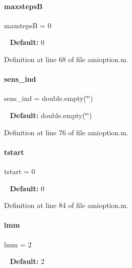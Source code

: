 \paragraph{\texorpdfstring{maxstepsB}{maxstepsB}}
{\footnotesize\ttfamily maxstepsB = 0}

~\newline
{\bfseries Default\+:} 0 

Definition at line 68 of file amioption.\+m.

\mbox{\label{classamioption_a0505783cf66f362672cbe3320d47a94d}} 
\paragraph{\texorpdfstring{sens\+\_\+ind}{sens\_ind}}
{\footnotesize\ttfamily sens\+\_\+ind = double.\+empty(\char`\"{}\char`\"{})}

~\newline
{\bfseries Default\+:} double.\+empty(\char`\"{}\char`\"{}) 

Definition at line 76 of file amioption.\+m.

\mbox{\label{classamioption_a18a69d8713604897ca9ee705d9d4fc4a}} 
\paragraph{\texorpdfstring{tstart}{tstart}}
{\footnotesize\ttfamily tstart = 0}

~\newline
{\bfseries Default\+:} 0 

Definition at line 84 of file amioption.\+m.

\mbox{\label{classamioption_a6f4b21b13e0c8c531c452c70b43fc96a}} 
\paragraph{\texorpdfstring{lmm}{lmm}}
{\footnotesize\ttfamily lmm = 2}

~\newline
{\bfseries Default\+:} 2 

